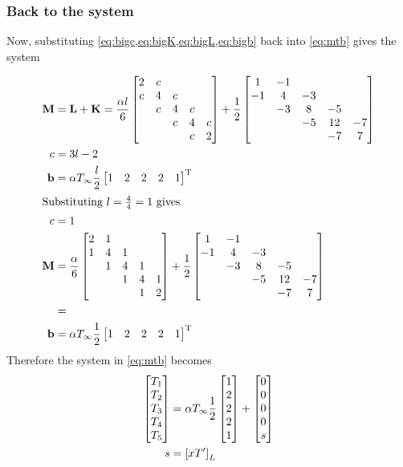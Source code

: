 \subsubsection*{Back to the system}
Now, substituting \cref{eq:bigc,eq:bigK,eq:bigL,eq:bigb} back into \cref{eq:mtb} gives
the system
\def\M{\ensuremath{\mathbf{M}}}

\begin{align}
  \M &= \L + \K =
  \frac{\alpha l}{6}
  \begin{bmatrix}
    2& c &&&\\
    c &4&c&&\\
    & c &4&c&\\
    &&c&4&c\\
    &&&c&2
  \end{bmatrix} + \matK \notag\\
  c &= \x \notag\\
  \b &=\alT \frac{l}{2}\begin{bmatrix}1&2&2&2&1\end{bmatrix}^{\text{T}} \notag\\
  \intertext{Substituting $l = \frac{4}{4} = 1$
  gives}
  c &= 1 \notag\\
  \M &=
       \frac{\alpha}{6}
       \begin{bmatrix}
         2& 1 &&&\\
         1 &4&1&&\\
         & 1 &4&1&\\
         &&1&4&1\\
         &&&1&2
       \end{bmatrix} + \matK \notag\\
     &=\MyGet{M} \label{eq:bigM}\\
  \b &=\alT \frac{1}{2}\begin{bmatrix}1&2&2&2&1\end{bmatrix}^{\text{T}} \notag \\
\end{align}
Therefore the system in \cref{eq:mtb} becomes
\begin{align}
  \MyGet{M}
  \begin{bmatrix} T_1 \\ T_2 \\ T_3 \\ T_4 \\ T_5 \end{bmatrix}
  &= \alT \frac{1}{2} \matb +
    \begin{bmatrix}
      0\\0\\0\\0\\ s
    \end{bmatrix} \label{eq:readyToSplit}\\
  s&= \eBdri{L} \notag
\end{align}
